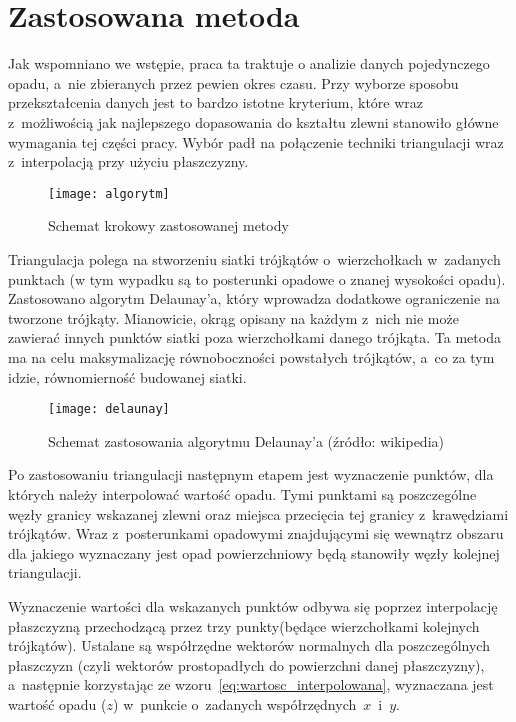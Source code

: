\section{Zastosowana metoda}
\label{sec:zastosowana_metoda}
Jak wspomniano we wstępie, praca ta traktuje o analizie danych pojedynczego opadu, a~nie zbieranych przez pewien okres czasu. Przy wyborze sposobu przekształcenia danych jest to bardzo istotne kryterium, które wraz z~możliwością jak najlepszego dopasowania do kształtu zlewni stanowiło główne wymagania tej części pracy. Wybór padł na połączenie techniki triangulacji wraz z~interpolacją przy użyciu płaszczyzny.

\begin{figure}[ht]
	\centering
	\texttt{[image: algorytm]}
	\caption{Schemat krokowy zastosowanej metody}
	\label{fig:delaunay}
\end{figure}

Triangulacja polega na stworzeniu siatki trójkątów o~wierzchołkach w~zadanych punktach (w tym wypadku są to posterunki opadowe o znanej wysokości opadu). Zastosowano algorytm Delaunay'a, który wprowadza dodatkowe ograniczenie na tworzone trójkąty. Mianowicie, okrąg opisany na każdym z~nich nie może zawierać innych punktów siatki poza wierzchołkami danego trójkąta. Ta metoda ma na celu maksymalizację równoboczności powstałych trójkątów, a~co za tym idzie, równomierność budowanej siatki.

\begin{figure}[ht]
	\centering
	\texttt{[image: delaunay]}
	\caption{Schemat zastosowania algorytmu Delaunay'a (źródło: wikipedia)}
	\label{fig:delaunay}
\end{figure}

Po zastosowaniu triangulacji następnym etapem jest wyznaczenie punktów, dla których należy interpolować wartość opadu. Tymi punktami są poszczególne węzły granicy wskazanej zlewni oraz miejsca przecięcia tej granicy z~krawędziami trójkątów. Wraz z~posterunkami opadowymi znajdującymi się wewnątrz obszaru dla jakiego wyznaczany jest opad powierzchniowy będą stanowiły węzły kolejnej triangulacji.

Wyznaczenie wartości dla wskazanych punktów odbywa się poprzez interpolację płaszczyzną przechodzącą przez trzy punkty(będące wierzchołkami kolejnych trójkątów). Ustalane są współrzędne wektorów normalnych dla poszczególnych płaszczyzn (czyli wektorów prostopadłych do powierzchni danej płaszczyzny), a~następnie korzystając ze wzoru~\ref{eq:wartosc_interpolowana}, wyznaczana jest wartość opadu ($z$) w~punkcie o~zadanych współrzędnych~$x$~i~$y$.

